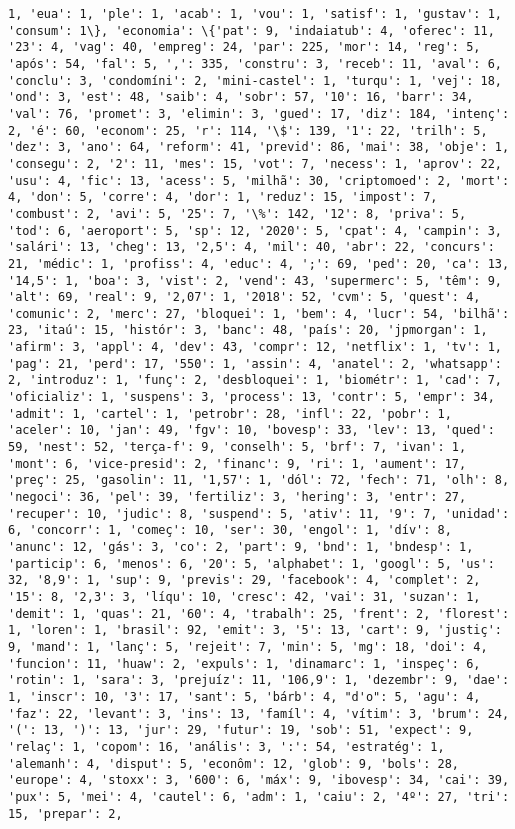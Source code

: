 \documentclass[11pt]{article}
\begin{document}
\begin{Verbatim}[commandchars=\\\{\}]
1, 'eua': 1, 'ple': 1, 'acab': 1, 'vou': 1, 'satisf': 1, 'gustav': 1, 'consum': 1\}, 'economia': \{'pat': 9, 'indaiatub': 4, 'oferec': 11, '23': 4, 'vag': 40, 'empreg': 24, 'par': 225, 'mor': 14, 'reg': 5, 'após': 54, 'fal': 5, ',': 335, 'constru': 3, 'receb': 11, 'aval': 6, 'conclu': 3, 'condomíni': 2, 'mini-castel': 1, 'turqu': 1, 'vej': 18, 'ond': 3, 'est': 48, 'saib': 4, 'sobr': 57, '10': 16, 'barr': 34, 'val': 76, 'promet': 3, 'elimin': 3, 'gued': 17, 'diz': 184, 'intenç': 2, 'é': 60, 'econom': 25, 'r': 114, '\$': 139, '1': 22, 'trilh': 5, 'dez': 3, 'ano': 64, 'reform': 41, 'previd': 86, 'mai': 38, 'obje': 1, 'consegu': 2, '2': 11, 'mes': 15, 'vot': 7, 'necess': 1, 'aprov': 22, 'usu': 4, 'fic': 13, 'acess': 5, 'milhã': 30, 'criptomoed': 2, 'mort': 4, 'don': 5, 'corre': 4, 'dor': 1, 'reduz': 15, 'impost': 7, 'combust': 2, 'avi': 5, '25': 7, '\%': 142, '12': 8, 'priva': 5, 'tod': 6, 'aeroport': 5, 'sp': 12, '2020': 5, 'cpat': 4, 'campin': 3, 'salári': 13, 'cheg': 13, '2,5': 4, 'mil': 40, 'abr': 22, 'concurs': 21, 'médic': 1, 'profiss': 4, 'educ': 4, ';': 69, 'ped': 20, 'ca': 13, '14,5': 1, 'boa': 3, 'vist': 2, 'vend': 43, 'supermerc': 5, 'têm': 9, 'alt': 69, 'real': 9, '2,07': 1, '2018': 52, 'cvm': 5, 'quest': 4, 'comunic': 2, 'merc': 27, 'bloquei': 1, 'bem': 4, 'lucr': 54, 'bilhã': 23, 'itaú': 15, 'histór': 3, 'banc': 48, 'país': 20, 'jpmorgan': 1, 'afirm': 3, 'appl': 4, 'dev': 43, 'compr': 12, 'netflix': 1, 'tv': 1, 'pag': 21, 'perd': 17, '550': 1, 'assin': 4, 'anatel': 2, 'whatsapp': 2, 'introduz': 1, 'funç': 2, 'desbloquei': 1, 'biométr': 1, 'cad': 7, 'oficializ': 1, 'suspens': 3, 'process': 13, 'contr': 5, 'empr': 34, 'admit': 1, 'cartel': 1, 'petrobr': 28, 'infl': 22, 'pobr': 1, 'aceler': 10, 'jan': 49, 'fgv': 10, 'bovesp': 33, 'lev': 13, 'qued': 59, 'nest': 52, 'terça-f': 9, 'conselh': 5, 'brf': 7, 'ivan': 1, 'mont': 6, 'vice-presid': 2, 'financ': 9, 'ri': 1, 'aument': 17, 'preç': 25, 'gasolin': 11, '1,57': 1, 'dól': 72, 'fech': 71, 'olh': 8, 'negoci': 36, 'pel': 39, 'fertiliz': 3, 'hering': 3, 'entr': 27, 'recuper': 10, 'judic': 8, 'suspend': 5, 'ativ': 11, '9': 7, 'unidad': 6, 'concorr': 1, 'começ': 10, 'ser': 30, 'engol': 1, 'dív': 8, 'anunc': 12, 'gás': 3, 'co': 2, 'part': 9, 'bnd': 1, 'bndesp': 1, 'particip': 6, 'menos': 6, '20': 5, 'alphabet': 1, 'googl': 5, 'us': 32, '8,9': 1, 'sup': 9, 'previs': 29, 'facebook': 4, 'complet': 2, '15': 8, '2,3': 3, 'líqu': 10, 'cresc': 42, 'vai': 31, 'suzan': 1, 'demit': 1, 'quas': 21, '60': 4, 'trabalh': 25, 'frent': 2, 'florest': 1, 'loren': 1, 'brasil': 92, 'emit': 3, '5': 13, 'cart': 9, 'justiç': 9, 'mand': 1, 'lanç': 5, 'rejeit': 7, 'min': 5, 'mg': 18, 'doi': 4, 'funcion': 11, 'huaw': 2, 'expuls': 1, 'dinamarc': 1, 'inspeç': 6, 'rotin': 1, 'sara': 3, 'prejuíz': 11, '106,9': 1, 'dezembr': 9, 'dae': 1, 'inscr': 10, '3': 17, 'sant': 5, 'bárb': 4, "d'o": 5, 'agu': 4, 'faz': 22, 'levant': 3, 'ins': 13, 'famíl': 4, 'vítim': 3, 'brum': 24, '(': 13, ')': 13, 'jur': 29, 'futur': 19, 'sob': 51, 'expect': 9, 'relaç': 1, 'copom': 16, 'anális': 3, ':': 54, 'estratég': 1, 'alemanh': 4, 'disput': 5, 'econôm': 12, 'glob': 9, 'bols': 28, 'europe': 4, 'stoxx': 3, '600': 6, 'máx': 9, 'ibovesp': 34, 'cai': 39, 'pux': 5, 'mei': 4, 'cautel': 6, 'adm': 1, 'caiu': 2, '4º': 27, 'tri': 15, 'prepar': 2, 
\end{Verbatim}
\end{document}
